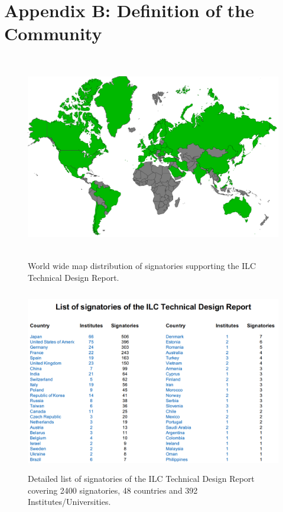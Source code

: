 \documentclass[%
 reprint,
 floatfix,
 amsmath,amssymb,
 aps,
]{revtex4-1}
\begin{document}
\newpage

\section*{\label{Appendix2} \Large{Appendix B: Definition of the Community}} 
\begin{figure}[h]
 \begin{center}
 \includegraphics[width=\hsize,height=9cm]{figures/WorldSignatoriesTDR.png}
\caption{World wide map distribution of signatories supporting the ILC Technical Design Report. \label{TDRsignatories}}
 \end{center}
 \end{figure}
 
 \begin{figure}[h]
 \begin{center}
 \includegraphics[width=\hsize,height=8cm]{figures/CountriesInstitutes.png}
\caption{Detailed list of signatories of the ILC Technical Design Report covering 2400 signatories, 48 countries and 392 Institutes/Universities. \label{TDRsignatories}}
 \end{center}
 \end{figure}
\end{document}
